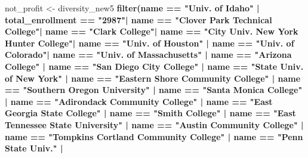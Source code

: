 \documentclass[
]{article}
\newenvironment{Shaded}{\begin{snugshade}}{\end{snugshade}}
\newcommand{\KeywordTok}[1]{\textcolor[rgb]{0.13,0.29,0.53}{\textbf{#1}}}
\newcommand{\NormalTok}[1]{#1}
\newcommand{\OperatorTok}[1]{\textcolor[rgb]{0.81,0.36,0.00}{\textbf{#1}}}
\newcommand{\StringTok}[1]{\textcolor[rgb]{0.31,0.60,0.02}{#1}}
\begin{document}
\begin{Shaded}
\begin{Highlighting}[]
\NormalTok{not_profit <-}\StringTok{ }\NormalTok{diversity_new5 }\OperatorTok{%
\StringTok{  }\KeywordTok{filter}\NormalTok{(name }\OperatorTok{==}\StringTok{ "Univ. of Idaho"} \OperatorTok{|}
\StringTok{           }\NormalTok{total_enrollment }\OperatorTok{==}\StringTok{ "2987"}\OperatorTok{|}
\StringTok{           }\NormalTok{name }\OperatorTok{==}\StringTok{ "Clover Park Technical College"}\OperatorTok{|}
\StringTok{           }\NormalTok{name }\OperatorTok{==}\StringTok{ "Clark College"}\OperatorTok{|}
\StringTok{           }\NormalTok{name }\OperatorTok{==}\StringTok{ "City Univ. New York Hunter College"}\OperatorTok{|}
\StringTok{           }\NormalTok{name }\OperatorTok{==}\StringTok{ "Univ. of Houston"} \OperatorTok{|}\StringTok{ }
\StringTok{           }\NormalTok{name }\OperatorTok{==}\StringTok{ "Univ. of Colorado"}\OperatorTok{|}
\StringTok{           }\NormalTok{name }\OperatorTok{==}\StringTok{ "Univ. of Massachusetts"} \OperatorTok{|}
\StringTok{           }\NormalTok{name }\OperatorTok{==}\StringTok{ "Arizona College"} \OperatorTok{|}
\StringTok{           }\NormalTok{name }\OperatorTok{==}\StringTok{ "San Diego City College"} \OperatorTok{|}\StringTok{ }
\StringTok{           }\NormalTok{name }\OperatorTok{==}\StringTok{ "State Univ. of New York"} \OperatorTok{|}\StringTok{ }
\StringTok{           }\NormalTok{name }\OperatorTok{==}\StringTok{ "Eastern Shore Community College"} \OperatorTok{|}\StringTok{ }
\StringTok{           }\NormalTok{name }\OperatorTok{==}\StringTok{ "Southern Oregon University"} \OperatorTok{|}\StringTok{ }
\StringTok{           }\NormalTok{name }\OperatorTok{==}\StringTok{ "Santa Monica College"} \OperatorTok{|}\StringTok{ }
\StringTok{           }\NormalTok{name }\OperatorTok{==}\StringTok{ "Adirondack Community College"} \OperatorTok{|}\StringTok{ }
\StringTok{           }\NormalTok{name }\OperatorTok{==}\StringTok{ "East Georgia State College"} \OperatorTok{|}\StringTok{ }
\StringTok{           }\NormalTok{name }\OperatorTok{==}\StringTok{ "Smith College"} \OperatorTok{|}\StringTok{ }
\StringTok{           }\NormalTok{name }\OperatorTok{==}\StringTok{ "East Tennessee State University"} \OperatorTok{|}\StringTok{ }
\StringTok{           }\NormalTok{name }\OperatorTok{==}\StringTok{ "Austin Community College"} \OperatorTok{|}\StringTok{ }
\StringTok{           }\NormalTok{name }\OperatorTok{==}\StringTok{ "Tompkins Cortland Community College"} \OperatorTok{|}\StringTok{ }
\StringTok{           }\NormalTok{name }\OperatorTok{==}\StringTok{ "Penn State Univ."} \OperatorTok{|}\StringTok{ }
}
\end{Highlighting}
\end{Shaded}
\end{document}
